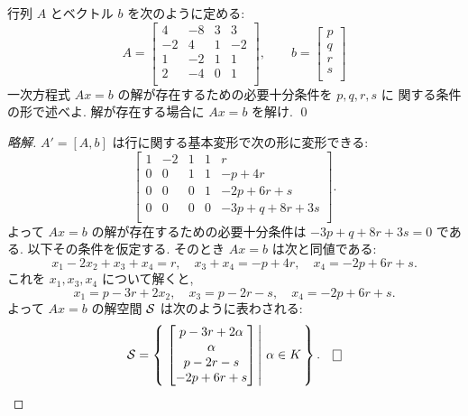 \documentclass[12pt,twoside]{jarticle}
\newcommand\commentout[1]{#1}
\newcommand\commentout[1]{}
\begin{document}

\begin{question}
  \label{q:sol-inhom-3}
  行列 $A$ とベクトル $b$ を次のように定める:
  \begin{equation*}
    A = 
    \begin{bmatrix}
       4 & -8 & 3 &  3 \\
      -2 &  4 & 1 & -2 \\
       1 & -2 & 1 &  1 \\
       2 & -4 & 0 &  1 \\
    \end{bmatrix},
    \qquad
    b =
    \begin{bmatrix}
      p \\
      q \\
      r \\
      s \\
    \end{bmatrix}
  \end{equation*}
  一次方程式 $Ax=b$ の解が存在するための必要十分条件を $p,q,r,s$ に
  関する条件の形で述べよ.  解が存在する場合に $Ax=b$ を解け. \qed
\end{question}

\commentout{
\begin{proof}[略解]
  $A'=[A,b]$ は行に関する基本変形で次の形に変形できる:
  \begin{equation*}
    \left[
      \begin{array}{cccc|c}
        1 & -2 & 1 & 1 & r \\
        0 &  0 & 1 & 1 & -p+4r \\
        0 &  0 & 0 & 1 & -2p+6r+s \\
        0 &  0 & 0 & 0 & -3p+q+8r+3s \\
      \end{array}
    \right].
  \end{equation*}
  よって $Ax=b$ の解が存在するための必要十分条件は $-3p+q+8r+3s=0$ である.
  以下その条件を仮定する.  そのとき $Ax=b$ は次と同値である:
  \begin{equation*}
    x_1 - 2x_2 + x_3 + x_4 = r, \quad
    x_3 + x_4 = -p+4r, \quad
    x_4 = -2p+6r+s.
  \end{equation*}
  これを $x_1,x_3,x_4$ について解くと,
  \begin{equation*}
    x_1 = p-3r + 2x_2, \quad
    x_3 = p-2r-s, \quad
    x_4 = -2p+6r+s.
  \end{equation*}
  よって $Ax=b$ の解空間 ${\mathcal S}$ は次のように表わされる:
  \begin{equation*}
    \cS =
    \left\{\,
      \left.
        \begin{bmatrix}
          p-3r + 2\alpha \\
          \alpha \\
          p-2r-s \\
          -2p+6r+s \\
        \end{bmatrix}
      \,\right|\,
      \alpha\in K
    \,\right\}.
    \qed
  \end{equation*}
\end{proof}
}
\end{document}
